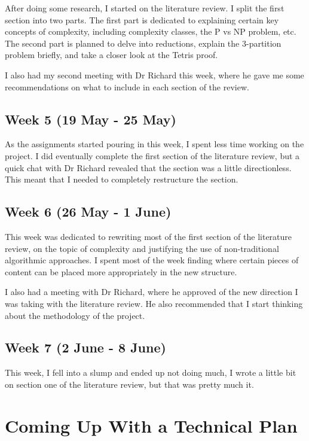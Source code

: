 \documentclass[a4paper, 12pt]{extreport}
\begin{document}
				After doing some research, I started on the literature review. I split the first section into two parts. The first part is dedicated to explaining certain key concepts of complexity, including complexity classes, the P vs NP problem, etc. The second part is planned to delve into reductions, explain the 3-partition problem briefly, and take a closer look at the Tetris proof.
				
				I also had my second meeting with Dr Richard this week, where he gave me some recommendations on what to include in each section of the review.
				
			\subsection{Week 5 (19 May - 25 May)}
			
				As the assignments started pouring in this week, I spent less time working on the project. I did eventually complete the first section of the literature review, but a quick chat with Dr Richard revealed that the section was a little directionless. This meant that I needed to completely restructure the section.
			
			\subsection{Week 6 (26 May - 1 June)}
			
				This week was dedicated to rewriting most of the first section of the literature review, on the topic of complexity and justifying the use of non-traditional algorithmic approaches. I spent most of the week finding where certain pieces of content can be placed more appropriately in the new structure.
				
				I also had a meeting with Dr Richard, where he approved of the new direction I was taking with the literature review. He also recommended that I start thinking about the methodology of the project.
			
			\subsection{Week 7 (2 June - 8 June)}
			
				This week, I fell into a slump and ended up not doing much, I wrote a little bit on section one of the literature review, but that was pretty much it.
		
		\section{Coming Up With a Technical Plan}
		
\end{document}
